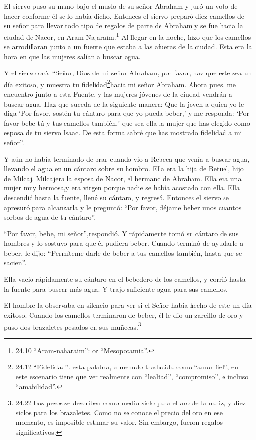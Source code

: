  El siervo puso su mano bajo el muslo de su señor Abraham y
juró un voto de hacer conforme él se lo había dicho. 
Entonces el siervo preparó diez camellos de su señor para llevar todo
tipo de regalos de parte de Abraham y se fue hacia la ciudad de Nacor,
en Aram-Najaraim.\footnote{24.10 ``Aram-naharaim'': or ``Mesopotamia''.}
 Al llegar en la noche, hizo que los camellos se
arrodillaran junto a un fuente que estaba a las afueras de la ciudad.
Esta era la hora en que las mujeres salían a buscar agua.

 Y el siervo oró: ``Señor, Dios de mi señor Abraham, por
favor, haz que este sea un día exitoso, y muestra tu
fidelidad\footnote{24.12 ``Fidelidad'': esta palabra, a menudo traducida
  como ``amor fiel'', en este escenario tiene que ver realmente con
  ``lealtad'', ``compromiso'', e incluso ``amabilidad''.}hacia mi señor
Abraham.  Ahora pues, me encuentro junto a esta Fuente, y
las mujeres jóvenes de la ciudad vendrán a buscar agua. 
Haz que suceda de la siguiente manera: Que la joven a quien yo le diga
`Por favor, sostén tu cántaro para que yo pueda beber,' y me responda:
`Por favor bebe tú y tus camellos también,' que sea ella la mujer que
has elegido como esposa de tu siervo Isaac. De esta forma sabré que has
mostrado fidelidad a mi señor''.

 Y aún no había terminado de orar cuando vio a Rebeca que
venía a buscar agua, llevando el agua en un cántaro sobre su hombro.
Ella era la hija de Betuel, hijo de Milcaj. Milcajera la esposa de
Nacor, el hermano de Abraham.  Ella era una mujer muy
hermosa,y era virgen porque nadie se había acostado con ella. Ella
descendió hasta la fuente, llenó su cántaro, y regresó. 
Entonces el siervo se apresuró para alcanzarla y le preguntó: ``Por
favor, déjame beber unos cuantos sorbos de agua de tu cántaro''.

 ``Por favor, bebe, mi señor'',respondió. Y rápidamente
tomó su cántaro de sus hombres y lo sostuvo para que él pudiera beber.
 Cuando terminó de ayudarle a beber, le dijo: ``Permíteme
darle de beber a tus camellos también, hasta que se sacien''.

 Ella vació rápidamente su cántaro en el bebedero de los
camellos, y corrió hasta la fuente para buscar más agua. Y trajo
suficiente agua para sus camellos.

 El hombre la observaba en silencio para ver si el Señor
había hecho de este un día exitoso.  Cuando los camellos
terminaron de beber, él le dio un zarcillo de oro y puso dos brazaletes
pesados en sus muñecas.\footnote{24.22 Los pesos se describen como medio
  siclo para el aro de la nariz, y diez siclos para los brazaletes. Como
  no se conoce el precio del oro en ese momento, es imposible estimar su
  valor. Sin embargo, fueron regalos significativos.}

